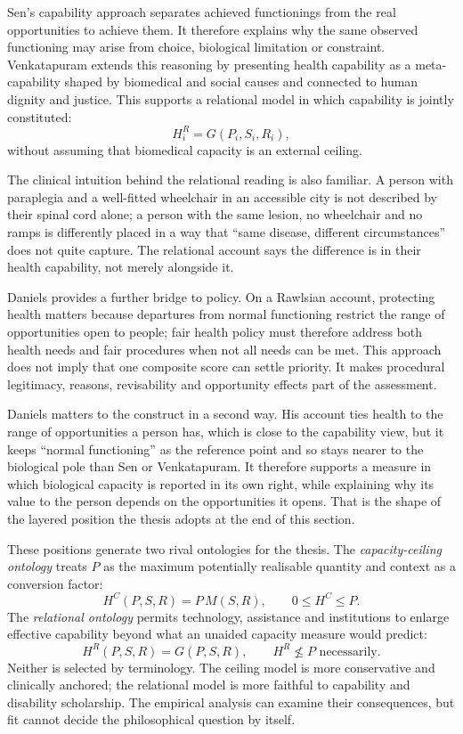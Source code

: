 Sen's capability approach separates achieved functionings from the real
opportunities to achieve them. \citep{sen_1993} It therefore explains why the
same observed functioning may arise from choice, biological limitation or
constraint. Venkatapuram extends this reasoning by presenting health capability
as a meta-capability shaped by biomedical and social causes and connected to
human dignity and justice. \citep{health_capability_right,venkatapuram_2011}
This supports a relational model in which capability is jointly constituted:
\[
H_i^{R}=G(P_i,S_i,R_i),
\]
without assuming that biomedical capacity is an external ceiling.

The clinical intuition behind the relational reading is also familiar. A person
with paraplegia and a well-fitted wheelchair in an accessible city is not
described by their spinal cord alone; a person with the same lesion, no
wheelchair and no ramps is differently placed in a way that ``same disease,
different circumstances'' does not quite capture. The relational account says
the difference is in their health capability, not merely alongside it.

Daniels provides a further bridge to policy. On a Rawlsian account, protecting
health matters because departures from normal functioning restrict the range of
opportunities open to people; fair health policy must therefore address both
health needs and fair procedures when not all needs can be met.
\citep{daniels_2007} This approach does not imply that one composite score can
settle priority. It makes procedural legitimacy, reasons, revisability and
opportunity effects part of the assessment.

Daniels matters to the construct in a second way. His account ties health to
the range of opportunities a person has, which is close to the capability view,
but it keeps ``normal functioning'' as the reference point and so stays nearer
to the biological pole than Sen or Venkatapuram. It therefore supports a
measure in which biological capacity is reported in its own right, while
explaining why its value to the person depends on the opportunities it opens.
That is the shape of the layered position the thesis adopts at the end of this
section.

These positions generate two rival ontologies for the thesis. The
\emph{capacity-ceiling ontology} treats $P$ as the maximum potentially
realisable quantity and context as a conversion factor:
\[
H^{C}(P,S,R)=P\,M(S,R),\qquad 0\le H^{C}\le P.
\]
The \emph{relational ontology} permits technology, assistance and institutions
to enlarge effective capability beyond what an unaided capacity measure would
predict:
\[
H^{R}(P,S,R)=G(P,S,R),\qquad H^{R}\not\le P\text{ necessarily}.
\]
Neither is selected by terminology. The ceiling model is more conservative and
clinically anchored; the relational model is more faithful to capability and
disability scholarship. The empirical analysis can examine their consequences,
but fit cannot decide the philosophical question by itself.

